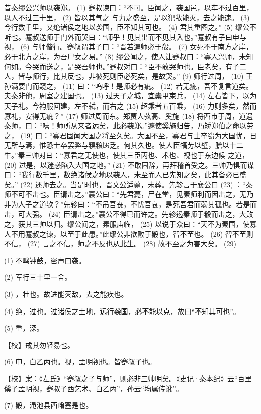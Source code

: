 \documentclass[12pt,UTF8]{ctexbook}
\begin{document}
昔秦缪公兴师以袭郑。 (1) 蹇叔谏曰：“不可。臣闻之，袭国邑，以车不过百里，以人不过三十里， (2) 皆以其气之 与力之盛至，是以犯敌能灭，去之能速。 (3) 今行数千里，又绝诸侯之地以袭国，臣不知其可也。 (4) 君其重图之。” (5) 缪公不听也。蹇叔送师于门外而哭曰：“师乎！见其出而不见其入也。”蹇叔有子曰申与视， (6) 与师偕行。蹇叔谓其子曰：“晋若遏师必于殽。 (7) 女死不于南方之岸，必于北方之岸，为吾尸女之易。” (8) 缪公闻之，使人让蹇叔曰：“寡人兴师，未知何如。今哭而送之，是哭吾师也。”蹇叔对曰：“臣不敢哭师也。臣老矣，有子二人，皆与师行，比其反也，非彼死则臣必死矣，是故哭。” (9) 师行过周， (10) 王孙满要门而窥之， (11) 曰：“呜呼！是师必有疵。 (12) 若无疵，吾不复言道矣。夫秦非他，周室之建国也。 (13) 过天子之城，宜橐甲束兵， (14) 左右皆下，以为天子礼。今袀服回建，左不轼，而右之 (15) 超乘者五百乘， (16) 力则多矣，然而寡礼，安得无疵？” (17) 师过周而东。郑贾人弦高、奚施 (18) 将西市于周，道遇秦师，曰：“嘻！师所从来者远矣，此必袭郑。”遽使奚施归告，乃矫郑伯之命以劳之， (19) 曰：“寡君固闻大国之将至久矣。大国不至，寡君与士卒窃为大国忧，日无所与焉，惟恐士卒罢弊与糗粮匮乏。何其久也。使人臣犒劳以璧，膳以十二牛。”秦三帅对曰：“寡君之无使也，使其三臣丙也、术也、视也于东边候 之道， (20) 过是，以迷惑陷入大国之地。” (21) 不敢固辞，再拜稽首受之。三帅乃惧而谋曰：“我行数千里，数绝诸侯之地以袭人，未至而人已先知之矣，此其备必已盛矣。” (22) 还师去之。当是时也，晋文公适薨，未葬。先轸言于襄公曰 (23) ：“秦师不可不击也。臣请击之。”襄公曰：“先君薨，尸在堂，见秦师利而因击之，无乃非为人子之道欤？”先轸曰：“不吊吾丧，不忧吾哀，是死吾君而弱其孤也。若是而击，可大强。 (24) 臣请击之。”襄公不得已而许之。先轸遏秦师于殽而击之，大败之，获其三帅以归。缪公闻之，素服庙临， (25) 以说于众曰：“天不为秦国，使寡人不用蹇叔之谏，以至于此患。”此缪公非欲败于殽也，智不至也。 (26) 智不至则不信， (27) 言之不信，师之不反也从此生。 (28) 故不至之为害大矣。 (29)

(1) 不鸣钟鼓，密声曰袭。

(2) 军行三十里一舍。

(3) ，壮也。故进能灭敌，去之能疾也。

(4) 绝，过也。过诸侯之土地，远行袭国，必不能以克，故曰“不知其可也”。

(5) 重，深。

【校】戒其勿轻易也。

(6) 申，白乙丙也。视，孟明视也。皆蹇叔子也。

【校】案：《左氏》“蹇叔之子与师”，则必非三帅明矣。《史记·秦本纪》云“百里傒子孟明视，蹇叔子西乞术、白乙丙”，孙云“均属传讹”。

(7) 殽，渑池县西崤塞是也。
\end{document}

